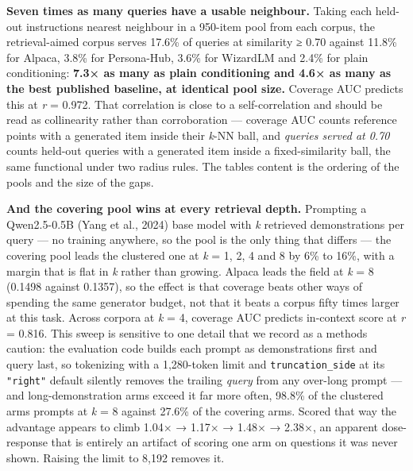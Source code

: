 \documentclass[
  10pt,
]{article}
\theoremstyle{plain}
\theoremstyle{definition}
\begin{document}
\textbf{Seven times as many queries have a usable neighbour.} Taking
each held-out instruction\textquotesingle s nearest neighbour in a
950-item pool from each corpus, the retrieval-aimed corpus serves 17.6\%
of queries at similarity ≥ 0.70 against 11.8\% for Alpaca, 3.8\% for
Persona-Hub, 3.6\% for WizardLM and 2.4\% for plain conditioning:
\textbf{7.3× as many as plain conditioning and 4.6× as many as the best
published baseline, at identical pool size.} Coverage AUC predicts this
at \emph{r} = 0.972. That correlation is close to a self-correlation and
should be read as collinearity rather than corroboration --- coverage
AUC counts reference points with a generated item inside their
\emph{k}-NN ball, and \emph{queries served at 0.70} counts held-out
queries with a generated item inside a fixed-similarity ball, the same
functional under two radius rules. The table\textquotesingle s content
is the ordering of the pools and the size of the gaps.

\textbf{And the covering pool wins at every retrieval depth.} Prompting
a Qwen2.5-0.5B (Yang et al., 2024) base model with \emph{k} retrieved
demonstrations per query --- no training anywhere, so the pool is the
only thing that differs --- the covering pool leads the clustered one at
\emph{k} = 1, 2, 4 and 8 by 6\% to 16\%, with a margin that is flat in
\emph{k} rather than growing. Alpaca leads the field at \emph{k} = 8
(0.1498 against 0.1357), so the effect is that coverage beats other ways
of spending the same generator budget, not that it beats a corpus fifty
times larger at this task. Across corpora at \emph{k} = 4, coverage AUC
predicts in-context score at \emph{r} = 0.816. This sweep is sensitive
to one detail that we record as a methods caution: the evaluation code
builds each prompt as demonstrations first and query last, so tokenizing
with a 1,280-token limit and \texttt{truncation\_side} at its
\texttt{"right"} default silently removes the trailing \emph{query} from
any over-long prompt --- and long-demonstration arms exceed it far more
often, 98.8\% of the clustered arm\textquotesingle s prompts at \emph{k}
= 8 against 27.6\% of the covering arm\textquotesingle s. Scored that
way the advantage appears to climb 1.04× → 1.17× → 1.48× → 2.38×, an
apparent dose-response that is entirely an artifact of scoring one arm
on questions it was never shown. Raising the limit to 8,192 removes it.
\end{document}
